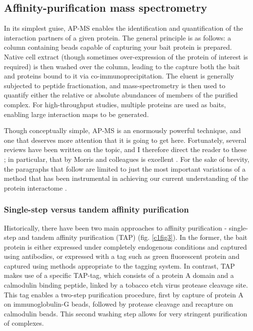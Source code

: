 \documentclass[a4paper,11pt,twoside,openright]{scrbook}
\begin{document}

\subsection{Affinity-purification mass spectrometry}
In its simplest guise, AP-MS enables the identification and quantification of the interaction partners of a given protein. The general principle is as follows: a column containing beads capable of capturing your bait protein is prepared. Native cell extract (though sometimes over-expression of the protein of interest is required) is then washed over the column, leading to the capture both the bait and proteins bound to it via co-immunoprecipitation. The eluent is generally subjected to peptide fractionation, and mass-spectrometry is then used to quantify either the relative or absolute abundances of members of the purified complex. For high-throughput studies, multiple proteins are used as baits, enabling large interaction maps to be generated.

Though conceptually simple, AP-MS is an enormously powerful technique, and one that deserves more attention that it is going to get here. Fortunately, several reviews have been written on the topic, and I therefore direct the reader to these \cite{Oeffinger2012,Morris2014,Aebersold2016}; in particular, that by Morris and colleagues is excellent \cite{Morris2014}. For the sake of brevity, the paragraphs that follow are limited to just the most important variations of a method that has been instrumental in achieving our current understanding of the protein interactome \cite{Malovannaya2011,Hein2015,Huttlin2015,Wan2015}.

\subsubsection{Single-step versus tandem affinity purification}
Historically, there have been two main approaches to affinity purification - single-step and tandem affinity purification \cite{Rigaut1999} (TAP) (fig. \ref{c1fig3}). In the former, the bait protein is either expressed under completely endogenous conditions and captured using antibodies, or expressed with a tag such as green fluorescent protein \cite{Hubner2010} and captured using methods appropriate to the tagging system. In contrast, TAP makes use of a specific TAP-tag, which consists of a protein A domain and a calmodulin binding peptide, linked by a tobacco etch virus protease cleavage site. This tag enables a two-step purification procedure, first by capture of protein A on immunoglobulin-G beads, followed by protease cleavage and recapture on calmodulin beads. This second washing step allows for very stringent purification of complexes.
\end{document}
